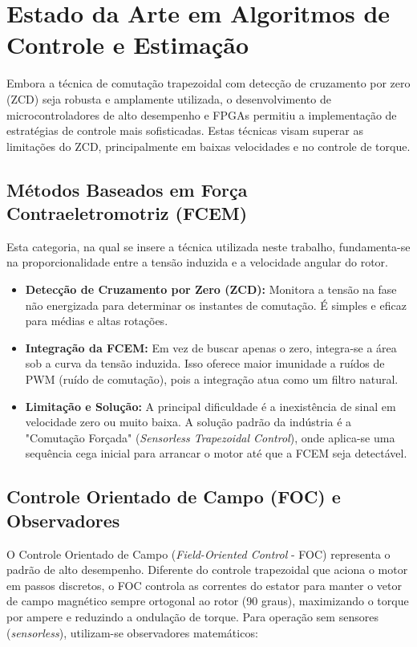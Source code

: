 \section{Estado da Arte em Algoritmos de Controle e Estimação}
\label{sec:estado_da_arte}

Embora a técnica de comutação trapezoidal com detecção de cruzamento por zero (ZCD) seja robusta e amplamente utilizada, o desenvolvimento de microcontroladores de alto desempenho e FPGAs permitiu a implementação de estratégias de controle mais sofisticadas. Estas técnicas visam superar as limitações do ZCD, principalmente em baixas velocidades e no controle de torque.

\subsection{Métodos Baseados em Força Contraeletromotriz (FCEM)}
Esta categoria, na qual se insere a técnica utilizada neste trabalho, fundamenta-se na proporcionalidade entre a tensão induzida e a velocidade angular do rotor.
\begin{itemize}
    \item \textbf{Detecção de Cruzamento por Zero (ZCD):} Monitora a tensão na fase não energizada para determinar os instantes de comutação. É simples e eficaz para médias e altas rotações.
    \item \textbf{Integração da FCEM:} Em vez de buscar apenas o zero, integra-se a área sob a curva da tensão induzida. Isso oferece maior imunidade a ruídos de PWM (ruído de comutação), pois a integração atua como um filtro natural.
    \item \textbf{Limitação e Solução:} A principal dificuldade é a inexistência de sinal em velocidade zero ou muito baixa. A solução padrão da indústria é a "Comutação Forçada" (\textit{Sensorless Trapezoidal Control}), onde aplica-se uma sequência cega inicial para arrancar o motor até que a FCEM seja detectável.
\end{itemize}

\subsection{Controle Orientado de Campo (FOC) e Observadores}
O Controle Orientado de Campo (\textit{Field-Oriented Control} - FOC) representa o padrão de alto desempenho. Diferente do controle trapezoidal que aciona o motor em passos discretos, o FOC controla as correntes do estator para manter o vetor de campo magnético sempre ortogonal ao rotor (90 graus), maximizando o torque por ampere e reduzindo a ondulação de torque. Para operação sem sensores (\textit{sensorless}), utilizam-se observadores matemáticos:

